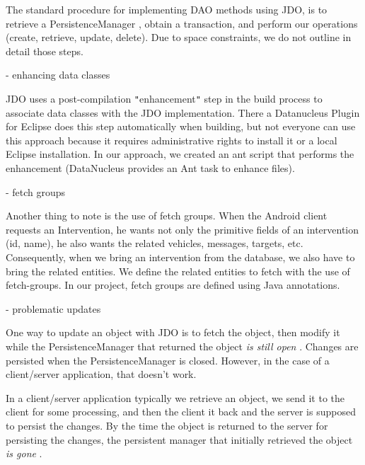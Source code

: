 \documentclass{article}
\begin{document}
\vspace{13pt}
{\color{color01} The standard procedure for implementing DAO methods using JDO, 
is to retrieve a PersistenceManager , obtain a transaction, and perform our operations 
(create, retrieve, update, delete). Due to space constraints, we do not outline 
in detail those steps.}

\vspace{13pt}
{\color{color01} - enhancing data classes}

\vspace{13pt}
{\color{color01} JDO uses a post-compilation \texttt{"}enhancement\texttt{"} step 
in the build process to associate data classes with the JDO implementation. There 
a Datanucleus Plugin for Eclipse does this step automatically when building, but 
not everyone can use this approach because it requires administrative rights to 
install it or a local Eclipse installation. In our approach, we created an ant 
script that performs the enhancement (DataNucleus provides an Ant task to enhance 
files).}

\vspace{13pt}
{\color{color01} - fetch groups}

\vspace{13pt}
{\color{color01} Another thing to note is the use of fetch groups. When the Android 
client requests an Intervention, he wants not only the primitive fields of an intervention 
(id, name), he also wants the related vehicles, messages, targets, etc. Consequently, 
when we bring an intervention from the database, we also have to bring the related 
entities. We define the related entities to fetch with the use of fetch-groups. 
In our project, fetch groups are defined using Java annotations.}

\vspace{13pt}
{\color{color01} - problematic updates}

\vspace{13pt}
{\color{color01} One way to update an object with JDO is to fetch the object, then 
modify it while the PersistenceManager that returned the object }{\color{color01} \textit{is 
still open}}{\color{color01} . Changes are persisted when the PersistenceManager 
is closed. However, in the case of a client/server application, that doesn't work. 
}

\vspace{13pt}
{\color{color01} In a client/server application typically we retrieve an object, 
we send it to the client for some processing, and then the client it back and the 
server is supposed to persist the changes. By the time the object is returned to 
the server for persisting the changes, the persistent manager that initially retrieved 
the object }{\color{color01} \textit{is gone}}{\color{color01} .}
\end{document}
